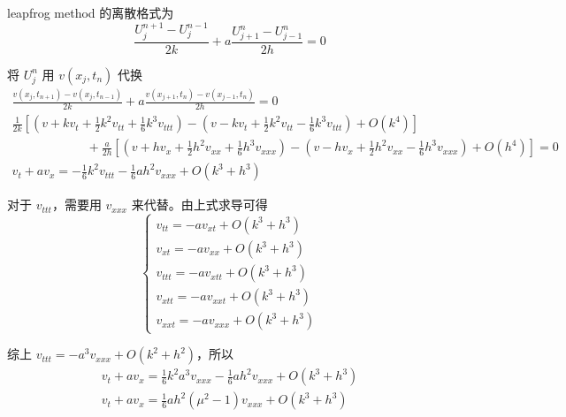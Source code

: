 \documentclass[a4paper]{article}
\begin{document}
\par leapfrog method 的离散格式为
\begin{equation}
    \frac{U_{j}^{n+1}-U_{j}^{n-1}}{2k} + a\frac{U_{j+1}^{n}-U_{j-1}^{n}}{2h} = 0
\end{equation}
\par 将 $U_{j}^{n}$ 用 $v(x_j, t_n)$ 代换
\begin{equation}
    \begin{gathered}  
        \frac{v(x_j, t_{n+1})-v(x_j, t_{n-1})}{2k} + a\frac{v(x_{j+1}, t_n)-v(x_{j-1}, t_n)}{2h}=0\\
        \frac{1}{2k}\left[
            \left(v+kv_t+\frac{1}{2}k^2v_{tt}+\frac{1}{6}k^3v_{ttt}\right)
            -\left(v-kv_t+\frac{1}{2}k^2v_{tt}-\frac{1}{6}k^3v_{ttt}\right)
            +O(k^4)
        \right]\qquad\qquad\qquad\\
        \qquad\qquad\qquad+\frac{a}{2h}\left[
            \left(v+hv_x+\frac{1}{2}h^2v_{xx}+\frac{1}{6}h^3v_{xxx}\right)
            -\left(v-hv_x+\frac{1}{2}h^2v_{xx}-\frac{1}{6}h^3v_{xxx}\right)
            +O(h^4)
        \right]=0\\
        v_t + av_x = -\frac{1}{6}k^2v_{ttt}-\frac{1}{6}ah^2v_{xxx}+O(k^3+h^3)
    \end{gathered}
\end{equation}
\par 对于 $v_{ttt}$，需要用 $v_{xxx}$ 来代替。由上式求导可得
\begin{equation}
    \begin{cases}
        v_{tt}
        = -av_{xt} + O(k^3+h^3)\\
        v_{xt}
        = -av_{xx} + O(k^3+h^3)\\
        v_{ttt}
        = -av_{xtt} + O(k^3+h^3)\\
        v_{xtt}
        = -av_{xxt} + O(k^3+h^3)\\
        v_{xxt}
        = -av_{xxx} + O(k^3+h^3)
    \end{cases}
\end{equation}
\par 综上 $v_{ttt} = -a^3v_{xxx} + O(k^2+h^2)$，所以
\begin{equation}
    \begin{gathered}
        v_t + av_x = \frac{1}{6}k^2a^3v_{xxx}-\frac{1}{6}ah^2v_{xxx}+O(k^3+h^3)\\
        v_t + av_x = \frac{1}{6}ah^2(\mu^2-1)v_{xxx}+O(k^3+h^3)
    \end{gathered}
\end{equation}
\end{document}
